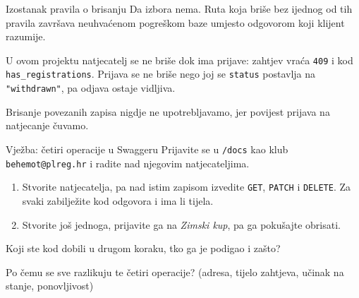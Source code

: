 \begin{frame}{Izostanak pravila o brisanju}
Da izbora nema. Ruta koja briše bez ijednog od tih pravila završava neuhvaćenom pogreškom baze umjesto odgovorom koji klijent razumije.

\begin{konvencija}
U ovom projektu natjecatelj se ne briše dok ima prijave: zahtjev vraća \texttt{409} i kod \texttt{has\_registrations}. Prijava se ne briše nego joj se \texttt{status} postavlja na \texttt{"withdrawn"}, pa odjava ostaje vidljiva.

\vspace{0.5em}
Brisanje povezanih zapisa nigdje ne upotrebljavamo, jer povijest prijava na natjecanje čuvamo.
\end{konvencija}
\end{frame}

\begin{frame}{Vježba: četiri operacije u Swaggeru}
Prijavite se u \texttt{/docs} kao klub \texttt{behemot@plreg.hr} i radite nad njegovim natjecateljima.

\vspace{1.1em}
\begin{enumerate}
  \itemsep0.6em
  \item Stvorite natjecatelja, pa nad istim zapisom izvedite \texttt{GET}, \texttt{PATCH} i \texttt{DELETE}. Za svaki zabilježite kod odgovora i ima li tijela.
  \item Stvorite još jednoga, prijavite ga na \emph{Zimski kup}, pa ga pokušajte obrisati.
\end{enumerate}

\vspace{1.1em}
Koji ste kod dobili u drugom koraku, tko ga je podigao i zašto?

\vspace{0.7em}
Po čemu se sve razlikuju te četiri operacije? (adresa, tijelo zahtjeva, učinak na stanje, ponovljivost)
\end{frame}


